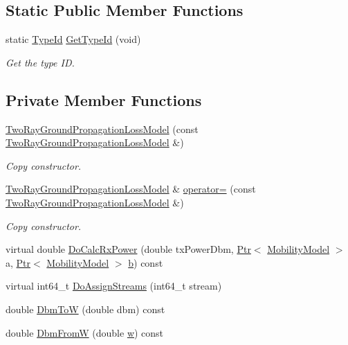 \subsection*{Static Public Member Functions}
\begin{DoxyCompactItemize}
\item 
static \hyperlink{classns3_1_1TypeId}{Type\+Id} \hyperlink{classns3_1_1TwoRayGroundPropagationLossModel_a98c51bc6c59d4e7fc552cab3a7d40c99}{Get\+Type\+Id} (void)
\begin{DoxyCompactList}\small\item\em Get the type ID. \end{DoxyCompactList}\end{DoxyCompactItemize}
\subsection*{Private Member Functions}
\begin{DoxyCompactItemize}
\item 
\hyperlink{classns3_1_1TwoRayGroundPropagationLossModel_a30bd13c6ac0fa406431580e82f5584fe}{Two\+Ray\+Ground\+Propagation\+Loss\+Model} (const \hyperlink{classns3_1_1TwoRayGroundPropagationLossModel}{Two\+Ray\+Ground\+Propagation\+Loss\+Model} \&)
\begin{DoxyCompactList}\small\item\em Copy constructor. \end{DoxyCompactList}\item 
\hyperlink{classns3_1_1TwoRayGroundPropagationLossModel}{Two\+Ray\+Ground\+Propagation\+Loss\+Model} \& \hyperlink{classns3_1_1TwoRayGroundPropagationLossModel_aaa3a333d0ce72cbb6f34b17e87d7183a}{operator=} (const \hyperlink{classns3_1_1TwoRayGroundPropagationLossModel}{Two\+Ray\+Ground\+Propagation\+Loss\+Model} \&)
\begin{DoxyCompactList}\small\item\em Copy constructor. \end{DoxyCompactList}\item 
virtual double \hyperlink{classns3_1_1TwoRayGroundPropagationLossModel_a72cae304e6cafffa4eb1dd6292e6f470}{Do\+Calc\+Rx\+Power} (double tx\+Power\+Dbm, \hyperlink{classns3_1_1Ptr}{Ptr}$<$ \hyperlink{classns3_1_1MobilityModel}{Mobility\+Model} $>$ a, \hyperlink{classns3_1_1Ptr}{Ptr}$<$ \hyperlink{classns3_1_1MobilityModel}{Mobility\+Model} $>$ \hyperlink{lte__pathloss_8m_a21ad0bd836b90d08f4cf640b4c298e7c}{b}) const 
\item 
virtual int64\+\_\+t \hyperlink{classns3_1_1TwoRayGroundPropagationLossModel_ab0209099839ac848deb0a286c913d54b}{Do\+Assign\+Streams} (int64\+\_\+t stream)
\item 
double \hyperlink{classns3_1_1TwoRayGroundPropagationLossModel_a29079a30226278a36b98b76b0b0756f0}{Dbm\+ToW} (double dbm) const 
\item 
double \hyperlink{classns3_1_1TwoRayGroundPropagationLossModel_a82a45ab0fc7d747fae39cf9c6cba911e}{Dbm\+FromW} (double \hyperlink{mmwave_2model_2fading-traces_2fading__trace__generator_8m_afd61ec66f9d7b807eece6eb12c781844}{w}) const 
\end{DoxyCompactItemize}
